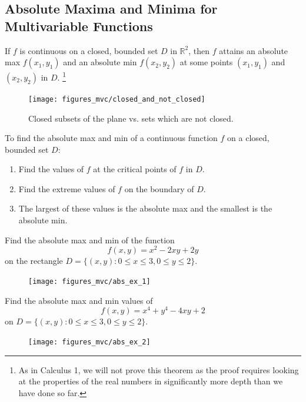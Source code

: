 \documentclass[12pt,letterpaper,reqno]{article}
\numberwithin{equation}{section}
\begin{document}
{\subsection{Absolute Maxima and Minima for Multivariable Functions}
\begin{thm}
 If $f$ is continuous on a closed, bounded set $D$ in $\mathbb{R}^2$, then $f$ attains an absolute max $f(x_1,y_1)$ and an absolute min $f(x_2,y_2)$ at some points $(x_1,y_1)$ and $(x_2,y_2)$ in $D$. \footnote{As in Calculus 1, we will not prove this theorem as the proof requires looking at the properties of the real numbers in significantly more depth than we have done so far.}
\end{thm}
\begin{figure}[h]
	\centering
	\texttt{[image: figures\_mvc/closed\_and\_not\_closed]}
	\caption{Closed subsets of the plane vs. sets which are not closed.}
\end{figure}
To find the absolute max and min of a continuous function $f$ on a closed, bounded set $D$:
\begin{enumerate}
	\item Find the values of $f$ at the critical points of $f$ in $D$.
	\item Find the extreme values of $f$ on the boundary of $D$.
	\item The largest of these values is the absolute max and the smallest is the absolute min.
\end{enumerate}	
\newpage
\begin{example}
Find the absolute max and min of the function $$f(x,y)=x^2-2xy+2y$$ on the rectangle $D=\{(x,y):0 \leq x \leq 3, 0 \leq y \leq 2\}$.
\begin{figure}[h]
	\centering
	\texttt{[image: figures\_mvc/abs\_ex\_1]}
\end{figure}	
\end{example}
 
\begin{exercise}
Find the absolute max and min values of
$$f(x,y)=x^4+y^4-4xy+2$$
on $D=\{(x,y):0 \leq x \leq 3, 0 \leq y \leq 2\}$.	
\end{exercise}

{\color{red}
\begin{solution}	
\end{solution}}
\begin{figure}[h]
	\centering
	\texttt{[image: figures\_mvc/abs\_ex\_2]}
\end{figure}	

}
\end{document}
